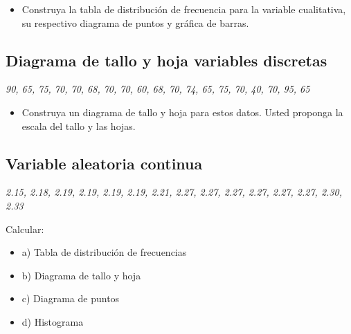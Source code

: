 \documentclass{../oxmathproblems}
\begin{document}
\begin{questions}
\begin{itemize}
\item Construya la tabla de distribución de frecuencia para la variable cualitativa, su respectivo diagrama de puntos y gráfica de barras.
\end{itemize}



\subsection{Diagrama de tallo y hoja variables discretas}


\textit{90, 65, 75, 70, 70, 68, 70, 70, 60, 68, 70, 74, 65, 75, 70, 40, 70, 95, 65}


\begin{itemize}
\item  Construya un diagrama de tallo y hoja para estos datos. Usted proponga la escala del tallo y las hojas.
\end{itemize}



\subsection{Variable aleatoria continua}


\textit{2.15, 2.18, 2.19, 2.19, 2.19, 2.19, 2.21, 2.27, 2.27, 2.27, 2.27, 2.27, 2.27, 2.30, 2.33}

Calcular: 
\begin{itemize}
\item a) Tabla de distribución de frecuencias
\item b) Diagrama de tallo y hoja
\item c) Diagrama de puntos 
\item d) Histograma 
\end{itemize}





\end{questions}
\end{document}
